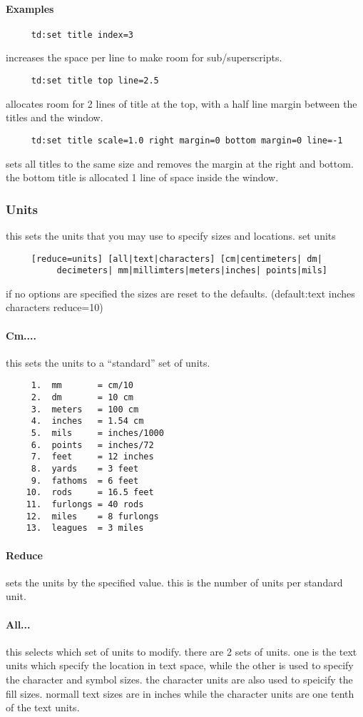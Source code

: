 \paragraph{Examples}
\begin{verbatim}
     td:set title index=3 
\end{verbatim}
increases the space per line to make room for sub/superscripts.  
\begin{verbatim}
     td:set title top line=2.5 
\end{verbatim}
allocates  room  for  2  lines  of title at the top, with a half line
margin between the titles and the window.  
\begin{verbatim}
     td:set title scale=1.0 right margin=0 bottom margin=0 line=-1 
\end{verbatim}
sets  all titles to the same size and removes the margin at the right
and bottom.  the bottom title is allocated 1 line of space inside the
window.  
\subsubsection{Units}
this sets the units that you may use to specify sizes and locations.  
set units 
\begin{verbatim}
     [reduce=units] [all|text|characters] [cm|centimeters| dm|
          decimeters| mm|millimters|meters|inches| points|mils] 
\end{verbatim}
if no options are specified the sizes are reset to the defaults.  
(default:text inches characters reduce=10) 
\paragraph{Cm....}
this sets the units to a ``standard'' set of units.  
\begin{verbatim}
     1.  mm       = cm/10 
     2.  dm       = 10 cm 
     3.  meters   = 100 cm 
     4.  inches   = 1.54 cm 
     5.  mils     = inches/1000 
     6.  points   = inches/72 
     7.  feet     = 12 inches 
     8.  yards    = 3 feet 
     9.  fathoms  = 6 feet 
    10.  rods     = 16.5 feet 
    11.  furlongs = 40 rods 
    12.  miles    = 8 furlongs 
    13.  leagues  = 3 miles 
\end{verbatim}
\paragraph{Reduce}
sets  the  units by the specified value.  this is the number of units
per standard unit.  
\paragraph{All...}
this  selects  which  set  of  units  to modify.  there are 2 sets of
units.  one is the text units which  specify  the  location  in  text
space,  while  the  other is used to specify the character and symbol
sizes.  the character units are also used to speicify the fill sizes.
normall  text  sizes  are in inches while the character units are one
tenth of the text units.  

